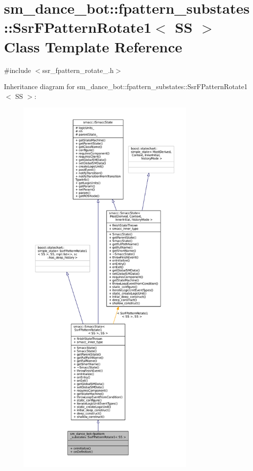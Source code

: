 \hypertarget{structsm__dance__bot_1_1fpattern__substates_1_1SsrFPatternRotate1}{}\section{sm\+\_\+dance\+\_\+bot\+:\+:fpattern\+\_\+substates\+:\+:Ssr\+F\+Pattern\+Rotate1$<$ SS $>$ Class Template Reference}
\label{structsm__dance__bot_1_1fpattern__substates_1_1SsrFPatternRotate1}


{\ttfamily \#include $<$ssr\+\_\+fpattern\+\_\+rotate\+\_.\+h$>$}



Inheritance diagram for sm\+\_\+dance\+\_\+bot\+:\+:fpattern\+\_\+substates\+:\+:Ssr\+F\+Pattern\+Rotate1$<$ SS $>$\+:
\nopagebreak
\begin{figure}[H]
\begin{center}
\leavevmode
\includegraphics[height=550pt]{structsm__dance__bot_1_1fpattern__substates_1_1SsrFPatternRotate1__inherit__graph}
\end{center}
\end{figure}


